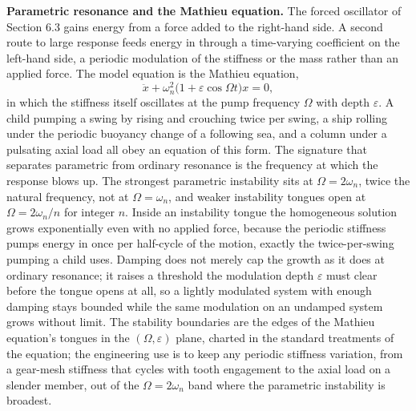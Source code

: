 \begin{mastery}
\textbf{Parametric resonance and the Mathieu equation.} The forced
oscillator of Section 6.3 gains energy from a force added to the
right-hand side. A second route to large response feeds energy in
through a time-varying coefficient on the left-hand side, a periodic
modulation of the stiffness or the mass rather than an applied force.
The model equation is the Mathieu equation,
\[
\ddot{x} + \omega_n^2\big(1 + \varepsilon\cos\Omega t\big)x = 0,
\]
in which the stiffness itself oscillates at the pump frequency $\Omega$
with depth $\varepsilon$. A child pumping a swing by rising and crouching
twice per swing, a ship rolling under the periodic buoyancy change of a
following sea, and a column under a pulsating axial load all obey an
equation of this form. The signature that separates parametric from
ordinary resonance is the frequency at which the response blows up. The
strongest parametric instability sits at $\Omega = 2\omega_n$, twice the
natural frequency, not at $\Omega = \omega_n$, and weaker instability
tongues open at $\Omega = 2\omega_n/n$ for integer $n$. Inside an
instability tongue the homogeneous solution grows exponentially even
with no applied force, because the periodic stiffness pumps energy in
once per half-cycle of the motion, exactly the twice-per-swing pumping a
child uses. Damping does not merely cap the growth as it does at ordinary
resonance; it raises a threshold the modulation depth $\varepsilon$ must
clear before the tongue opens at all, so a lightly modulated system with
enough damping stays bounded while the same modulation on an
undamped system grows without limit. The stability boundaries are the
edges of the Mathieu equation's tongues in the $(\Omega, \varepsilon)$
plane, charted in the standard treatments of the equation; the
engineering use is to keep any periodic stiffness variation, from a
gear-mesh stiffness that cycles with tooth engagement to the axial load
on a slender member, out of the $\Omega = 2\omega_n$ band where the
parametric instability is broadest.
\end{mastery}

